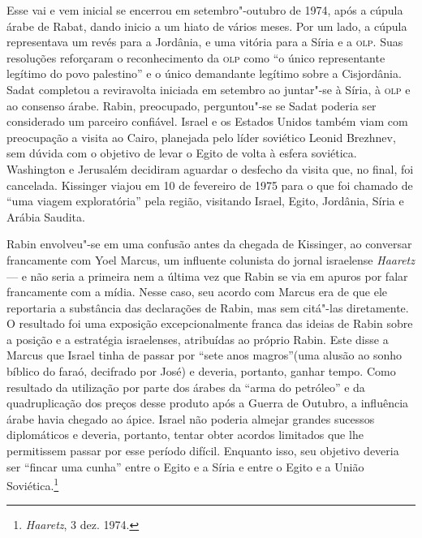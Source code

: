 Esse vai e vem inicial se encerrou em setembro"-outubro de 1974, após a
cúpula árabe de Rabat, dando inicio a um hiato de vários meses. Por um
lado, a cúpula representava um revés para a Jordânia, e uma vitória para
a Síria e a \textsc{olp}. Suas resoluções reforçaram o reconhecimento da \textsc{olp} como
``o único representante legítimo do povo palestino'' e o único
demandante legítimo sobre a Cisjordânia. Sadat completou a reviravolta
iniciada em setembro ao juntar"-se à Síria, à \textsc{olp} e ao consenso árabe.
Rabin, preocupado, perguntou"-se se Sadat poderia ser considerado um
parceiro confiável. Israel e os Estados Unidos também viam com
preocupação a visita ao Cairo, planejada pelo líder soviético Leonid
Brezhnev, sem dúvida com o objetivo de levar o Egito de volta à esfera
soviética. Washington e Jerusalém decidiram aguardar o desfecho da
visita que, no final, foi cancelada. Kissinger viajou em 10 de fevereiro
de 1975 para o que foi chamado de ``uma viagem exploratória'' pela
região, visitando Israel, Egito, Jordânia, Síria e Arábia Saudita.

Rabin envolveu"-se em uma confusão antes da chegada de Kissinger, ao
conversar francamente com Yoel Marcus, um influente colunista do jornal
israelense \textit{Haaretz} --- e não seria a primeira nem a última
vez que Rabin se via em apuros por falar francamente com a mídia.
Nesse caso, seu acordo com Marcus era de que ele reportaria a substância
das declarações de Rabin, mas sem citá"-las diretamente. O resultado foi
uma exposição excepcionalmente franca das ideias de Rabin sobre a
posição e a estratégia israelenses, atribuídas ao próprio Rabin. Este
disse a Marcus que Israel tinha de passar por ``sete anos magros''(uma
alusão ao sonho bíblico do faraó, decifrado por José) e deveria,
portanto, ganhar tempo. Como resultado da utilização por parte dos
árabes da ``arma do petróleo'' e da quadruplicação dos preços desse
produto após a Guerra de Outubro, a influência árabe havia chegado ao
ápice. Israel não poderia almejar grandes sucessos diplomáticos e
deveria, portanto, tentar obter acordos limitados que lhe permitissem
passar por esse período difícil. Enquanto isso, seu objetivo deveria ser
``fincar uma cunha'' entre o Egito e a Síria e entre o Egito e a União
Soviética.\footnote{\textit{Haaretz}, 3 dez. 1974.}


